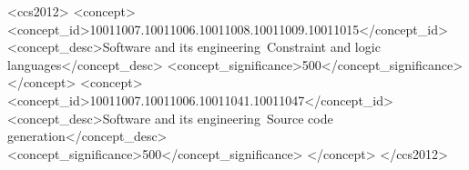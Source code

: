 \documentclass[acmlarge]{acmart}
\begin{document}
\begin{CCSXML}
<ccs2012>
<concept>
<concept_id>10011007.10011006.10011008.10011009.10011015</concept_id>
<concept_desc>Software and its engineering~Constraint and logic languages</concept_desc>
<concept_significance>500</concept_significance>
</concept>
<concept>
<concept_id>10011007.10011006.10011041.10011047</concept_id>
<concept_desc>Software and its engineering~Source code generation</concept_desc>
<concept_significance>500</concept_significance>
</concept>
</ccs2012>
\end{CCSXML}





\maketitle

\thispagestyle{empty}








% 
\end{document}
